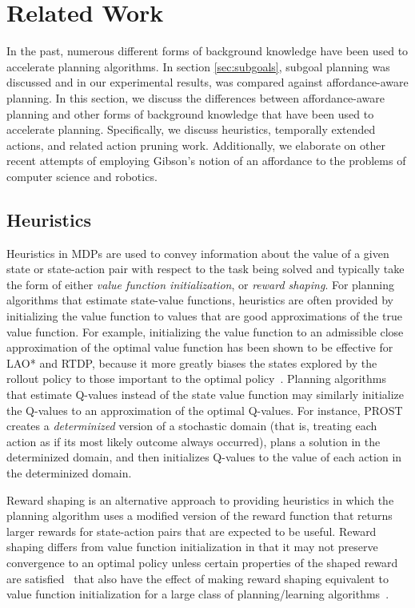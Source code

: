 \documentclass[]{article}
\begin{document}
\section{Related Work}
In the past, numerous different forms of background knowledge have been used to 
accelerate planning algorithms. In section \ref{sec:subgoals}, subgoal
planning was discussed and in our experimental results, was compared against affordance-aware planning. 
In this section, we discuss the differences between affordance-aware planning and other
forms of background knowledge that have been used to accelerate planning.
Specifically, we discuss heuristics, temporally extended actions, and related action pruning work.
Additionally, we elaborate on other recent attempts of employing Gibson's notion of an affordance 
to the problems of computer science and robotics.


\subsection{Heuristics}
Heuristics in MDPs are used to convey information about the value of a given state or state-action pair with respect to the task being solved and typically take the form of either {\em value function initialization},
or {\em reward shaping}. For planning algorithms that estimate state-value functions, heuristics are often
provided by initializing the value function to values that are good approximations of the true value function. For example, initializing the value function to an admissible close approximation of the optimal value function has been shown to be effective for LAO* and RTDP, because it more greatly biases the states explored by the rollout policy to those important to the optimal policy~\cite{Hansen:1999qf}. Planning algorithms that estimate Q-values instead of the state value function may similarly initialize the Q-values to an approximation of the optimal Q-values. For instance, PROST~\cite{keller2012prost} creates a {\em determinized} version of a stochastic domain (that is, treating each action as if its most likely outcome always occurred), plans a solution in the determinized domain, and then initializes Q-values to the value of each action in the determinized domain.

Reward shaping is an alternative approach to providing heuristics in which the planning algorithm uses a modified version of the reward function that returns larger rewards for state-action pairs that are expected to be useful. Reward shaping differs from value function initialization in that it may not preserve convergence to an optimal policy unless certain properties of the shaped reward are satisfied~\cite{potshap} that also have the effect of making reward shaping equivalent to value function initialization for a large class of planning/learning algorithms~\cite{Wiewiora:2003fk}.
\end{document}
